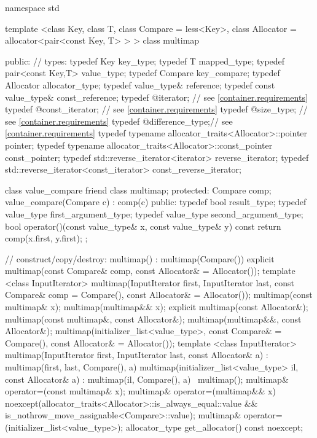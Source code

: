 \begin{codeblock}
namespace std {
  template <class Key, class T, class Compare = less<Key>,
            class Allocator = allocator<pair<const Key, T> > >
  class multimap {
  public:
    // types:
    typedef Key                                   key_type;
    typedef T                                     mapped_type;
    typedef pair<const Key,T>                     value_type;
    typedef Compare                               key_compare;
    typedef Allocator                             allocator_type;
    typedef value_type&                           reference;
    typedef const value_type&                     const_reference;
    typedef @\impdef@                iterator;       // see \ref{container.requirements}
    typedef @\impdef@                const_iterator; // see \ref{container.requirements}
    typedef @\impdef@                size_type;      // see \ref{container.requirements}
    typedef @\impdef@                difference_type;// see \ref{container.requirements}
    typedef typename allocator_traits<Allocator>::pointer           pointer;
    typedef typename allocator_traits<Allocator>::const_pointer     const_pointer;
    typedef std::reverse_iterator<iterator>       reverse_iterator;
    typedef std::reverse_iterator<const_iterator> const_reverse_iterator;

    class value_compare {
    friend class multimap;
    protected:
      Compare comp;
      value_compare(Compare c) : comp(c) { }
    public:
      typedef bool result_type;
      typedef value_type first_argument_type;
      typedef value_type second_argument_type;
      bool operator()(const value_type& x, const value_type& y) const {
        return comp(x.first, y.first);
      }
    };

    // construct/copy/destroy:
    multimap() : multimap(Compare()) { }
    explicit multimap(const Compare& comp, const Allocator& = Allocator());
    template <class InputIterator>
      multimap(InputIterator first, InputIterator last,
               const Compare& comp = Compare(),
               const Allocator& = Allocator());
    multimap(const multimap& x);
    multimap(multimap&& x);
    explicit multimap(const Allocator&);
    multimap(const multimap&, const Allocator&);
    multimap(multimap&&, const Allocator&);
    multimap(initializer_list<value_type>,
      const Compare& = Compare(),
      const Allocator& = Allocator());
    template <class InputIterator>
      multimap(InputIterator first, InputIterator last, const Allocator& a)
        : multimap(first, last, Compare(), a) { }
    multimap(initializer_list<value_type> il, const Allocator& a)
      : multimap(il, Compare(), a) { }
   ~multimap();
    multimap& operator=(const multimap& x);
    multimap& operator=(multimap&& x)
      noexcept(allocator_traits<Allocator>::is_always_equal::value &&
               is_nothrow_move_assignable<Compare>::value);
    multimap& operator=(initializer_list<value_type>);
    allocator_type get_allocator() const noexcept;

}}
\end{codeblock}

